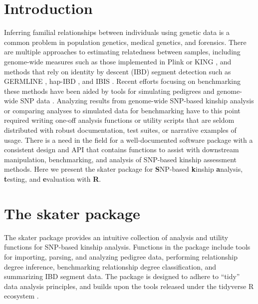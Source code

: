 \documentclass{bioinfo}
\begin{document}
\maketitle

\section{Introduction}

Inferring familial relationships between individuals using genetic data
is a common problem in population genetics, medical genetics, and
forensics. There are multiple approaches to estimating relatedness
between samples, including genome-wide measures such as those
implemented in Plink \citep{purcell2007} or KING
\citep{manichaikul2010}, and methods that rely on identity by descent
(IBD) segment detection such as GERMLINE \citep{gusev2009}, hap-IBD
\citep{zhou2020}, and IBIS \citep{seidman2020}. Recent efforts focusing
on benchmarking these methods \citep{ramstetter2017, vries2021} have
been aided by tools for simulating pedigrees and genome-wide SNP data
\citep{caballero2019}. Analyzing results from genome-wide SNP-based
kinship analysis or comparing analyses to simulated data for
benchmarking have to this point required writing one-off analysis
functions or utility scripts that are seldom distributed with robust
documentation, test suites, or narrative examples of usage. There is a
need in the field for a well-documented software package with a
consistent design and API that contains functions to assist with
downstream manipulation, benchmarking, and analysis of SNP-based kinship
assessment methods. Here we present the skater package for
\textbf{S}NP-based \textbf{k}inship \textbf{a}nalysis, \textbf{t}esting,
and \textbf{e}valuation with \textbf{R}.

\section{The skater package}

The skater package provides an intuitive collection of analysis and
utility functions for SNP-based kinship analysis. Functions in the
package include tools for importing, parsing, and analyzing pedigree
data, performing relationship degree inference, benchmarking
relationship degree classification, and summarizing IBD segment data.
The package is designed to adhere to ``tidy'' data analysis principles,
and builds upon the tools released under the tidyverse R ecosystem
\citep{Wickham2019}.
\end{document}
